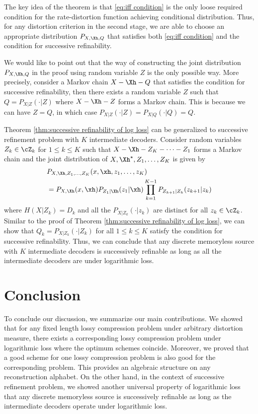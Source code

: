 \documentclass[draftclsnofoot, onecolumn, letterpaper, romanappendices]{IEEEtran}
\begin{document}
The key idea of the theorem is that \eqref{eq:iff condition} is the only loose
required condition for the rate-distortion function achieving conditional distribution.
Thus, for any distortion criterion in the second stage,
we are able to choose an appropriate distribution $P_{X,\Xh,Q}$
that satisfies both \eqref{eq:iff condition} and the condition for successive refinability.

\begin{remark}
    We would like to point out that the way of constructing the joint
    distribution $P_{X,\Xh,Q}$ in the proof using random variable $Z$
    is the only possible way.
    More precisely, consider a Markov chain $X-\Xh-Q$ that satisfies the condition
    for successive refinability, then there exists a random variable $Z$
    such that $Q = P_{X|Z}(\cdot|Z)$ where $X-\Xh-Z$ forms a Markov chain.
    This is because we can have $Z=Q$, in which case $P_{X|Z}(\cdot|Z) =  P_{X|Q}(\cdot|Q)=Q$. 
\end{remark}

Theorem \ref{thm:successive refinability of log loss} can be generalized to
successive refinement problem with $K$ intermediate decoders.
Consider random variables $Z_k\in\cZ_k$ for $1\leq k\leq K$ such that
$X-\Xh-Z_K-\cdots-Z_1$ forms a Markov chain and the joint distribution of
$X,\Xh^\star,Z_1,\ldots,Z_K$ is given by
\begin{align*}
    &P_{X,\Xh,Z_1,\ldots,Z_K}(x,\xh,z_1,\ldots,z_K)\nonumber\\ 
    &= P_{X,\Xh}(x,\xh)P_{Z_1|\Xh}(z_1|\xh) \prod_{k=1}^{K-1} P_{Z_{k+1}|Z_k}(z_{k+1}|z_k)
\end{align*}
where $H(X|Z_k) = D_k$ and all the $P_{X|Z_k}(\cdot|z_k)$ are distinct for all $z_k\in\cZ_k$.
Similar to the proof of Theorem \ref{thm:successive refinability of log loss},
we can show that $Q_k =  P_{X|Z_k}(\cdot|Z_k)$ for all $1\leq k\leq K$
satisfy the condition for successive refinability.
Thus, we can conclude that any discrete memoryless source with $K$ intermediate decoders
is successively refinable as long as all the intermediate decoders are under logarithmic loss.


\section{Conclusion}
To conclude our discussion, we summarize our main contributions.
We showed that for any fixed length lossy compression problem under arbitrary distortion measure,
there exists a corresponding lossy compression problem under logarithmic loss
where the optimum schemes coincide.
Moreover, we proved that a good scheme for one lossy compression problem is also good for the corresponding problem.
This provides an algebraic structure on any reconstruction alphabet.
On the other hand, in the context of successive refinement problem,
we showed another universal property of logarithmic loss
that any discrete memoryless source is successively refinable
as long as the intermediate decoders operate under logarithmic loss.






\end{document}
